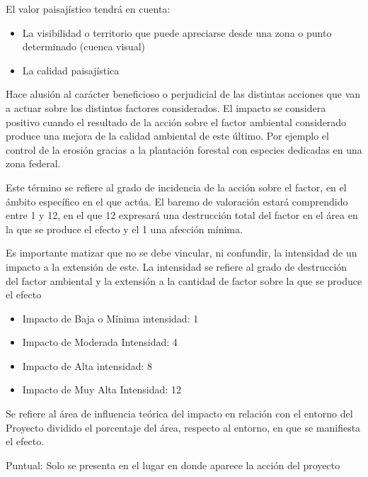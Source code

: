 El valor paisajístico tendrá en cuenta:
\begin{itemize}
    \item La visibilidad o territorio que puede apreciarse desde una zona o punto determinado (cuenca visual)
    \item La calidad paisajística
\end{itemize}
\begin{definition}[Signo]
    Hace alusión al carácter beneficioso o perjudicial de las distintas acciones que van a actuar sobre los distintos factores considerados. El impacto se considera positivo cuando el resultado de la acción sobre el factor ambiental considerado produce una mejora de la calidad ambiental de este último. Por ejemplo el control de la erosión gracias a la plantación forestal con especies dedicadas en una zona federal.
\end{definition}

\begin{definition}[Intesidad]
Este término se refiere al grado de incidencia de la acción sobre el factor, en el ámbito específico en el que actúa. El baremo de valoración estará comprendido entre 1 y 12, en el que 12 expresará una destrucción total del factor en el área en la que se produce el efecto y el 1 una afección mínima.
\end{definition}
Es importante matizar que no se debe vincular, ni confundir, la intensidad de un impacto a la extensión de este. La intensidad se refiere al grado de destrucción del factor ambiental y la extensión a la cantidad de factor sobre la que se produce el efecto
\begin{itemize}
    \item Impacto de Baja o Mínima intensidad: 1
    \item Impacto de Moderada Intensidad: 4
    \item Impacto de Alta intensidad: 8
    \item Impacto de Muy Alta Intensidad: 12
\end{itemize}
\begin{definition}[Extensión (EX)]
Se refiere al área de influencia teórica del impacto en relación con el entorno del Proyecto dividido el porcentaje del área, respecto al entorno, en que se manifiesta el efecto.
\end{definition}
Puntual: Solo se presenta en el lugar en donde aparece la acción del proyecto

